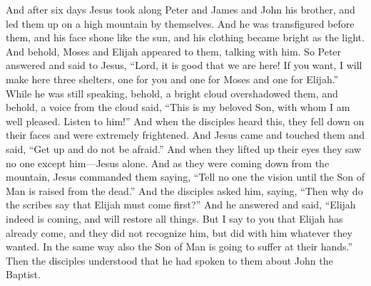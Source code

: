 \begin{biblechapter} %
 And after six days Jesus took along Peter and James and John his brother, and led them up on a high mountain by themselves.
\verse And he was transfigured before them, and his face shone like the sun, and his clothing became bright as the light.
\verse And behold, Moses and Elijah appeared to them, talking with him.
\verse So Peter answered and said to Jesus, “Lord, it is good that we are here! If you want, I will make here three shelters, one for you and one for Moses and one for Elijah.”
\verse While he was still speaking, behold, a bright cloud overshadowed them, and behold, a voice from the cloud said, “This is my beloved Son, with whom I am well pleased. Listen to him!”
\verse And when the disciples heard this, they fell down on their faces and were extremely frightened.
\verse And Jesus came and touched them and said, “Get up and do not be afraid.”
\verse And when they lifted up their eyes they saw no one except him—Jesus alone.
\verse And as they were coming down from the mountain, Jesus commanded them saying, “Tell no one the vision until the Son of Man is raised from the dead.”
\verse And the disciples asked him, saying, “Then why do the scribes say that Elijah must come first?”
\verse And he answered and said, “Elijah indeed is coming, and will restore all things.
\verse But I say to you that Elijah has already come, and they did not recognize him, but did with him whatever they wanted. In the same way also the Son of Man is going to suffer at their hands.”
\verse Then the disciples understood that he had spoken to them about John the Baptist.

\end{biblechapter}
